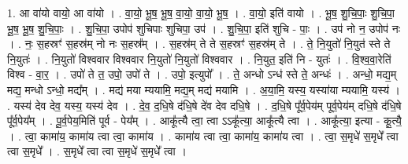 \documentclass[17pt]{extarticle}
\begin{document}
1. आ वा॑यो वायो॒ आ वा॑यो । . वा॒यो॒ भू॒ष॒ भू॒ष॒ वा॒यो॒ वा॒यो॒ भू॒ष॒ । . वा॒यो॒ इति॑ वायो । . भू॒ष॒ शु॒चि॒पाः॒ शु॒चि॒पा॒ भू॒ष॒ भू॒ष॒ शु॒चि॒पाः॒ । . शु॒चि॒पा॒ उपोप॑ शुचिपाः शुचिपा॒ उप॑ । . शु॒चि॒पा॒ इति॑ शुचि - पाः॒ । . उप॑ नो न॒ उपोप॑ नः । . नः॒ स॒हस्रꣳ॑ स॒हस्र॑म् नो नः स॒हस्र᳚म् । . स॒हस्र॑म् ते ते स॒हस्रꣳ॑ स॒हस्र॑म् ते । . ते॒ नि॒युतो॑ नि॒युत॑ स्ते ते नि॒युतः॑ । . नि॒युतो॑ विश्ववार विश्ववार नि॒युतो॑ नि॒युतो॑ विश्ववार । . नि॒युत॒ इति॑ नि - युतः॑ । . वि॒श्व॒वा॒रेति॑ विश्व - वा॒र॒ । . उपो॑ ते त॒ उपो॒ उपो॑ ते । . उपो॒ इत्युपो᳚ । . ते॒ अन्धो ऽन्ध॑ स्ते ते॒ अन्धः॑ । . अन्धो॒ मद्य॒म् मद्य॒ मन्धो ऽन्धो॒ मद्य᳚म् । . मद्य॑ मया म्ययामि॒ मद्य॒म् मद्य॑ मयामि । . अ॒या॒मि॒ यस्य॒ यस्या॑या म्ययामि॒ यस्य॑ । . यस्य॑ देव देव॒ यस्य॒ यस्य॑ देव । . दे॒व॒ द॒धि॒षे द॑धि॒षे दे॑व देव दधि॒षे । . द॒धि॒षे पू᳚र्व॒पेय॑म् पूर्व॒पेय॑म् दधि॒षे द॑धि॒षे पू᳚र्व॒पेय᳚म् । . पू॒र्व॒पेय॒मिति॑ पूर्व - पेय᳚म् । . आकू᳚त्यै त्वा॒ त्वा ऽऽकू᳚त्या॒ आकू᳚त्यै त्वा । . आकू᳚त्या॒ इत्या - कू॒त्यै॒ । . त्वा॒ कामा॑य॒ कामा॑य त्वा त्वा॒ कामा॑य । . कामा॑य त्वा त्वा॒ कामा॑य॒ कामा॑य त्वा । . त्वा॒ स॒मृधे॑ स॒मृधे᳚ त्वा त्वा स॒मृधे᳚ । . स॒मृधे᳚ त्वा त्वा स॒मृधे॑ स॒मृधे᳚ त्वा । \newline
\end{document}
